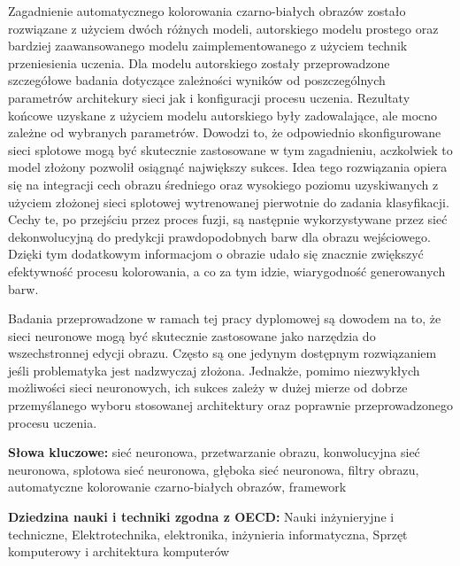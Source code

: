   Zagadnienie automatycznego kolorowania czarno-białych
  obrazów zostało rozwiązane z użyciem dwóch różnych modeli, autorskiego modelu
  prostego oraz bardziej zaawansowanego modelu zaimplementowanego z użyciem technik
  przeniesienia uczenia. Dla modelu autorskiego zostały przeprowadzone szczegółowe
  badania dotyczące zależności wyników od poszczególnych parametrów architekury
  sieci jak i konfiguracji procesu uczenia. Rezultaty końcowe uzyskane z użyciem
  modelu autorskiego były zadowalające, ale mocno zależne od wybranych parametrów.
  Dowodzi to, że odpowiednio skonfigurowane sieci splotowe mogą być skutecznie
  zastosowane w tym zagadnieniu, aczkolwiek to model złożony pozwolił osiągnąć
  największy sukces.
  Idea tego rozwiązania opiera się na integracji cech obrazu średniego oraz wysokiego
  poziomu uzyskiwanych z użyciem złożonej sieci splotowej wytrenowanej pierwotnie do
  zadania klasyfikacji. Cechy te, po przejściu przez proces fuzji, są następnie
  wykorzystywane przez sieć dekonwolucyjną do predykcji prawdopodobnych barw dla
  obrazu wejściowego. Dzięki tym dodatkowym informacjom o obrazie udało się
  znacznie zwiększyć efektywność procesu kolorowania, a co za tym idzie,
  wiarygodność generowanych barw.

  Badania przeprowadzone w ramach tej pracy dyplomowej są dowodem na to, że
  sieci neuronowe mogą być skutecznie zastosowane jako narzędzia do wszechstronnej
  edycji obrazu. Często są one jedynym dostępnym rozwiązaniem jeśli problematyka
  jest nadzwyczaj złożona. Jednakże, pomimo niezwykłych możliwości sieci
  neuronowych, ich sukces zależy w dużej mierze od dobrze przemyślanego
  wyboru stosowanej architektury oraz poprawnie przeprowadzonego
  procesu uczenia.

  \bigskip

  \noindent\textbf{Słowa kluczowe:} sieć neuronowa, przetwarzanie obrazu,
  konwolucyjna sieć neuronowa, splotowa sieć neuronowa,
  głęboka sieć neuronowa, filtry obrazu, automatyczne kolorowanie czarno-białych
  obrazów, framework

  \bigskip

  \noindent\textbf{Dziedzina nauki i techniki zgodna z OECD:} Nauki
  inżynieryjne i techniczne, Elektrotechnika, elektronika, inżynieria
  informatyczna, Sprzęt komputerowy i architektura komputerów
